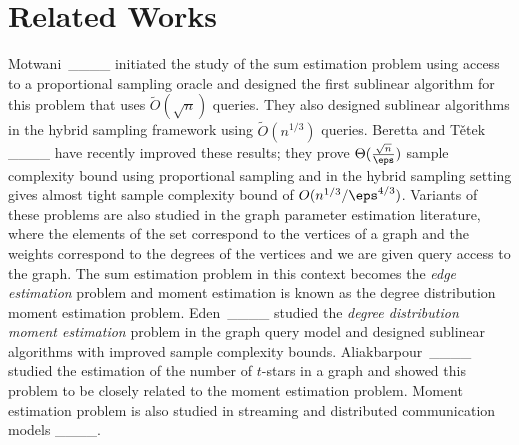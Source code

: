 \section{Related Works}
Motwani~\etal____ initiated the study of the sum estimation problem using access to a proportional sampling oracle and designed the first sublinear algorithm for this problem that uses $\tilde{O}(\sqrt{n})$ queries. They also designed sublinear algorithms in the hybrid sampling framework using $\tilde{O}(n^{1/3})$ queries. Beretta and T{\v{e}}tek ____ have recently improved these results; they prove $\Theta(\frac{\sqrt{n}}{\eps})$ sample complexity bound using proportional sampling and in the hybrid sampling setting gives almost tight sample complexity bound of $O(n^{1/3}/\eps^{4/3})$. Variants of these problems are also studied in the graph parameter estimation literature, where the elements of the set correspond to the vertices of a graph and the weights correspond to the degrees of the vertices and we are given query access to the graph. The sum estimation problem in this context becomes the {\it edge estimation} problem and moment estimation is known as the degree distribution moment estimation problem. Eden~\etal____ studied the {\it degree distribution moment estimation} problem in the graph query model and designed sublinear algorithms with improved sample complexity bounds. Aliakbarpour~\etal____ studied the estimation of the number of $t$-stars in a graph and showed this problem to be closely related to the moment estimation problem. Moment estimation problem is also studied in streaming and distributed communication models ____.

%